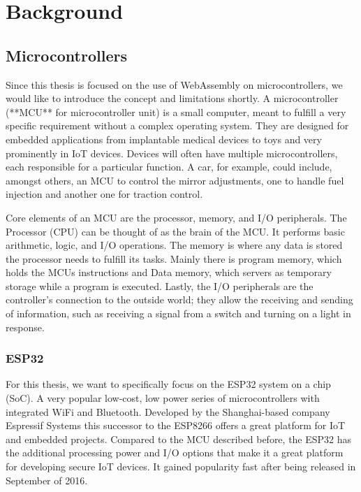 
\chapter{Background}\label{chapter:background}

\section{Microcontrollers}
Since this thesis is focused on the use of WebAssembly on microcontrollers, we would like to introduce the concept and limitations shortly. A microcontroller (**MCU** for microcontroller unit) is a small computer, meant to fulfill a very specific requirement without a complex operating system. They are designed for embedded applications from implantable medical devices to toys and very prominently in IoT devices. Devices will often have multiple microcontrollers, each responsible for a particular function. A car, for example, could include, amongst others, an MCU to control the mirror adjustments, one to handle fuel injection and another one for traction control.

Core elements of an MCU are the processor, memory, and I/O peripherals. The Processor (CPU) can be thought of as the brain of the MCU. It performs basic arithmetic, logic, and I/O operations. The memory is where any data is stored the processor needs to fulfill its tasks. Mainly there is program memory, which holds the MCUs instructions and Data memory, which servers as temporary storage while a program is executed. Lastly, the I/O peripherals are the controller's connection to the outside world; they allow the receiving and sending of information, such as receiving a signal from a switch and turning on a light in response.
\subsection{ESP32}
For this thesis, we want to specifically focus on the ESP32 system on a chip (SoC). A very popular low-cost, low power series of microcontrollers with integrated WiFi and Bluetooth. Developed by the Shanghai-based company Espressif Systems this successor to the ESP8266 offers a great platform for IoT and embedded projects. Compared to the MCU described before, the ESP32 has the additional processing power and I/O options that make it a great platform for developing secure IoT devices. It gained popularity fast after being released in September of 2016.


